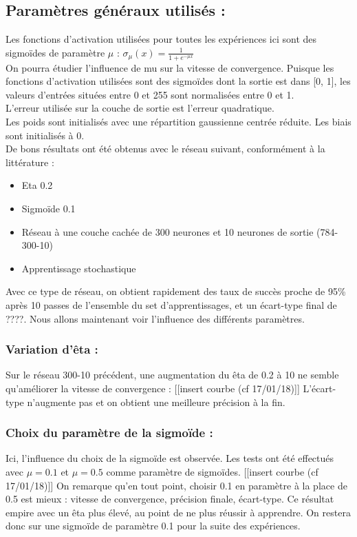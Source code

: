 \subsection*{Paramètres généraux utilisés :} %
Les fonctions d’activation utilisées pour toutes les expériences ici sont des sigmoïdes de paramètre $\mu$ : 
$\sigma_\mu(x) = \frac{1}{1+e^{-\mu x}}$\\
On pourra étudier l’influence de mu sur la vitesse de convergence.
Puisque les fonctions d’activation utilisées sont des sigmoïdes dont la sortie est dans [0, 1], les valeurs d’entrées situées entre 0 et 255 sont normalisées entre 0 et 1.\\
L’erreur utilisée sur la couche de sortie est l’erreur quadratique.\\
Les poids sont initialisés avec une répartition gaussienne centrée réduite. Les biais sont initialisés à 0.\\
De bons résultats ont été obtenus avec le réseau suivant, conformément à la littérature :
\begin{itemize}
	\item Eta 0.2
	\item Sigmoïde 0.1
	\item Réseau à une couche cachée de 300 neurones et 10 neurones de sortie (784-300-10)
	\item Apprentissage stochastique
\end{itemize}
Avec ce type de réseau, on obtient rapidement des taux de succès proche de 95\% après 10 passes de l’ensemble du set d’apprentissages, et un écart-type final de ????. Nous allons maintenant voir l’influence des différents paramètres.

\subsubsection*{Variation d’êta :}


Sur le réseau 300-10 précédent, une augmentation du êta de 0.2 à 10 ne semble qu’améliorer la vitesse de convergence : [[insert courbe (cf 17/01/18)]]
L’écart-type n’augmente pas et on obtient une meilleure précision à la fin.

\subsubsection*{Choix du paramètre de la sigmoïde :}
Ici, l’influence du choix de la sigmoïde est observée. Les tests ont été effectués avec $\mu = 0.1$ et $\mu = 0.5$ comme paramètre de sigmoïdes.
[[insert courbe (cf 17/01/18)]]
On remarque qu’en tout point, choisir 0.1 en paramètre à la place de 0.5 est mieux : vitesse de convergence, précision finale, écart-type. Ce résultat empire avec un êta plus élevé, au point de ne plus réussir à apprendre. On restera donc sur une sigmoïde de paramètre 0.1 pour la suite des expériences.

